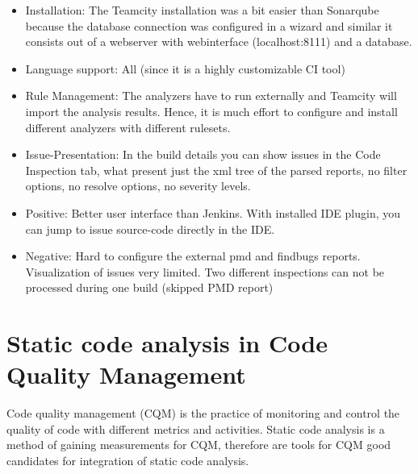 \documentclass[conference]{IEEEtran}
\begin{document}
\begin{itemize}
	\item Installation: The Teamcity installation was a bit easier than Sonarqube because the database connection was configured in a wizard and similar it consists out of a webserver with webinterface (localhost:8111) and a database.
	
	\item Language support: All (since it is a highly customizable CI tool)
	
	\item Rule Management: The analyzers have to run externally and Teamcity will import the analysis results.
	Hence, it is much effort to configure and install different analyzers with different rulesets.
	
	\item Issue-Presentation: In the build details you can show issues in the Code Inspection tab, what present just the xml tree of the parsed reports, no filter options, no resolve options, no severity levels.
	
	\item Positive: Better user interface than Jenkins. With installed IDE plugin, you can jump to issue source-code directly in the IDE. 
	
	\item Negative: Hard to configure the external pmd and findbugs reports. Visualization of issues very limited. Two different inspections can not be processed during one build (skipped PMD report)
	
\end{itemize}





\section{Static code analysis in Code Quality Management}
\label{sec:static_code_analysis_code_quality_management}


Code quality management (CQM) is the practice of monitoring and control the quality of code with different metrics and activities.
Static code analysis is a method of gaining measurements for CQM, therefore are tools for CQM good candidates for integration of static code analysis.

\end{document}
